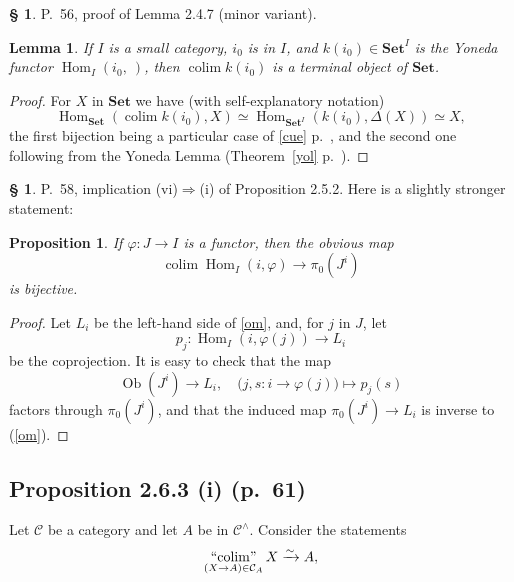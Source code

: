 \documentclass[12pt]{article}
\newtheorem{lem}[thm]{Lemma}
\newtheorem{prop}[thm]{Proposition}
\theoremstyle{remark}
\theoremstyle{definition}
\newtheorem{s}[thm]{\S}
\newcommand{\C}{\mathcal C}
\newcommand{\Set}{\mathbf{Set}}
\newcommand{\pp}{\varphi}
\newcommand{\then}{\Rightarrow}
\DeclareMathOperator*{\colim}{colim}
\DeclareMathOperator*{\ic}{``\!\colim\!"}
\DeclareMathOperator{\Hom}{Hom}
\DeclareMathOperator{\Ob}{Ob}
\begin{document}
\begin{s} 
P.~56, proof of Lemma 2.4.7 (minor variant).

\begin{lem} 
If $I$ is a small category, $i_0$ is in $I$, and $k(i_0)\in\Set^I$ is the Yoneda functor $\Hom_I(i_0,\ )$, then $\colim k(i_0)$ is a terminal object of $\Set$. 
\end{lem}

\begin{proof}
For $X$ in $\Set$ we have (with self-explanatory notation)
$$
\Hom_{\Set}\left(\colim k(i_0),X\right)\simeq\Hom_{{\Set}^I}(k(i_0),\Delta(X))\simeq X,
$$
the first bijection being a particular case of \eqref{cue} p.~\pageref{cue}, and the second one following from the Yoneda Lemma (Theorem~\ref{yol} p.~\pageref{yol}).
\end{proof}
\end{s}

%

\begin{s} 
P.~58, implication (vi)$\then$(i) of Proposition 2.5.2. Here is a slightly stronger statement:

\begin{prop} 
If $\pp:J\to I$ is a functor, then the obvious map
%
\begin{equation}\label{om}
\colim\Hom_I(i,\pp)\to\pi_0(J^i)
\end{equation}
%
is bijective. 
\end{prop}

\begin{proof} 
Let $L_i$ be the left-hand side of \eqref{om}, and, for $j$ in $J$, let 
$$
p_j:\Hom_I(i,\pp(j))\to L_i
$$
be the coprojection. It is easy to check that the map 
$$
\Ob(J^i)\to L_i,\quad\Big(j,s:i\to\pp(j)\Big)\mapsto p_j(s)
$$
factors through $\pi_0(J^i)$, and that the induced map $\pi_0(J^i)\to L_i$ is inverse to (\ref{om}).
\end{proof}
\end{s}

%

\subsection{Proposition 2.6.3 (i) (p.~61)}

Let $\C$ be a category and let $A$ be in $\C^\wedge$. Consider the statements
%
\begin{equation}\label{263a}
\ic_{(X\to A)\in\C_A}X\xrightarrow\sim A,
\end{equation} 
\end{document}
